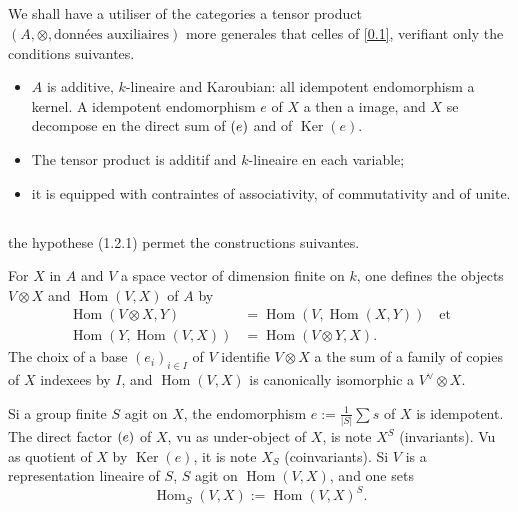 \documentclass[11pt,a4paper]{article}
\theoremstyle{plain}
\theoremstyle{definition}
\DeclareMathOperator{\Hom}{Hom}
\DeclareMathOperator{\Ker}{Ker}
\let\Im\relax
\DeclareMathOperator{\Im}{Im}
\begin{document}
\subsection{}\label{1.2}

We shall have a utiliser of the categories a tensor product $(A,\otimes,\text{donn\'ees auxiliaires})$ more generales that celles of \ref{0.1}, verifiant only the conditions suivantes.

\begin{itemize}
\item[(1.2.1)] $A$ is additive, $k$-lineaire and Karoubian: all idempotent endomorphism a kernel. A idempotent endomorphism $e$ of $X$ a then a image, and $X$ se decompose en the direct sum of $\Im(e)$ and of $\Ker(e)$.
\item[(1.2.2)] The tensor product is additif and $k$-lineaire en each variable;
\item[(1.2.3)] it is equipped with contraintes of associativity, of commutativity and of unite.
\end{itemize}

\subsection{}\label{1.3}

the hypothese (1.2.1) permet the constructions suivantes.

For $X$ in $A$ and $V$ a space vector of dimension finite on $k$, one defines the objects $V\otimes X$ and $\Hom(V,X)$ of $A$ by
\begin{align}
\Hom(V\otimes X,Y) &= \Hom(V,\Hom(X,Y))\quad\text{et}\label{1.3.1}\\
\Hom(Y,\Hom(V,X)) &= \Hom(V\otimes Y,X).\label{1.3.2}
\end{align}
The choix of a base $(e_i)_{i\in I}$ of $V$ identifie $V\otimes X$ a the sum of a family of copies of $X$ indexees by $I$, and $\Hom(V,X)$ is canonically isomorphic a $V^\vee\otimes X$.

Si a group finite $S$ agit on $X$, the endomorphism $e:=\frac{1}{|S|}\sum s$ of $X$ is idempotent. The direct factor $\Im(e)$ of $X$, vu as under-object of $X$, is note $X^S$ (invariants). Vu as quotient of $X$ by $\Ker(e)$, it is note $X_S$ (coinvariants). Si $V$ is a representation lineaire of $S$, $S$ agit on $\Hom(V,X)$, and one sets
\begin{equation}\label{1.3.3}
\Hom_S(V,X):=\Hom(V,X)^S.
\end{equation}
\end{document}
